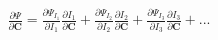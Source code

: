 \documentclass[preview]{standalone}
\begin{document}
\begin{align*}
\frac{\partial \Psi}{\partial \mathbf{C}}  =  \frac{\partial \Psi_{I_1}}{\partial I_1}\frac{\partial I_1}{\partial \mathbf{C}}  +  \frac{\partial \Psi_{I_2}}{\partial I_2}\frac{\partial I_2}{\partial \mathbf{C}}  +  \frac{\partial \Psi_{I_3}}{\partial I_3}\frac{\partial I_3}{\partial \mathbf{C}}  + ...
\end{align*}
\end{document}
